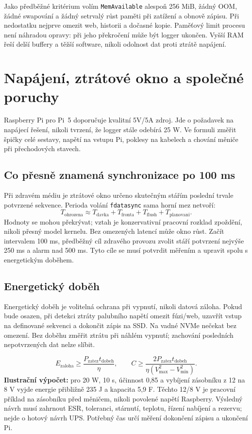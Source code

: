 \documentclass[11pt,a4paper]{article}
\newcommand{\novastrana}{\clearpage}
\begin{document}
Jako předběžné kritérium volím \texttt{MemAvailable} alespoň 256 MiB, žádný OOM, žádné swapování a žádný setrvalý růst paměti při zatížení a obnově zápisu. Při nedostatku nejprve omezit web, historii a dočasné kopie. Paměťový limit procesu není náhradou opravy: při jeho překročení může být logger ukončen. Vyšší RAM řeší delší buffery a těžší software, nikoli odolnost dat proti ztrátě napájení.

\novastrana
\section{Napájení, ztrátové okno a společné poruchy}
Raspberry Pi pro Pi~5 doporučuje kvalitní 5V/5A zdroj. Jde o požadavek na napájecí řešení, nikoli tvrzení, že logger stále odebírá 25 W. Ve formuli změřit špičky celé sestavy, napětí na vstupu Pi, poklesy na kabelech a chování měniče při přechodových stavech.\cite{pi5}

\subsection{Co přesně znamená synchronizace po 100 ms}
Při zdravém médiu je ztrátové okno určeno skutečným stářím poslední trvale potvrzené sekvence. Perioda volání \texttt{fdatasync} sama horní mez netvoří:
\begin{equation}
T_{\mathrm{ohrozena}}\approx T_{\mathrm{davka}}+T_{\mathrm{fronta}}+
T_{\mathrm{flush}}+T_{\mathrm{planovani}}.
\end{equation}
Hodnoty se mohou překrývat; vztah je konzervativní pracovní rozklad zpoždění, nikoli přesný model kernelu. Bez omezených latencí může okno růst. Začít intervalem 100 ms, předběžný cíl zdravého provozu zvolit stáří potvrzení nejvýše 250 ms a alarm nad 500 ms. Tyto cíle se musí potvrdit měřením a upravit spolu s energetickým doběhem.

\subsection{Energetický doběh}
Energetický doběh je volitelná ochrana při vypnutí, nikoli datová záloha. Pokud bude osazen, při detekci ztráty palubního napětí omezit fúzi/web, uzavřít vstup na definované sekvenci a dokončit zápis na SSD. Na vadné NVMe nečekat bez omezení. Bez doběhu změřit ztrátu při náhlém vypnutí; zachování posledních nepotvrzených dat nelze slíbit.

\begin{equation}
E_{\mathrm{zaloha}}\geq\frac{P_{\mathrm{zatez}}t_{\mathrm{dobeh}}}{\eta},\qquad
C\geq\frac{2P_{\mathrm{zatez}}t_{\mathrm{dobeh}}}{\eta(V_{\max}^{2}-V_{\min}^{2})}.
\end{equation}
\textbf{Ilustrační výpočet:} pro 20 W, 10 s, účinnost 0,85 a vybíjení zásobníku z 12 na 8 V vyjde energie přibližně 235 J a kapacita 5,9 F. Těchto 12/8 V je pracovní příklad na zásobníku před měničem, nikoli povolené napětí Raspberry. Výsledný návrh musí zahrnout ESR, toleranci, stárnutí, teplotu, řízení nabíjení a rezervu; nejde o hotový návrh UPS. Potřebný čas určí měření dokončení zápisu a ukončení Pi.
\end{document}
